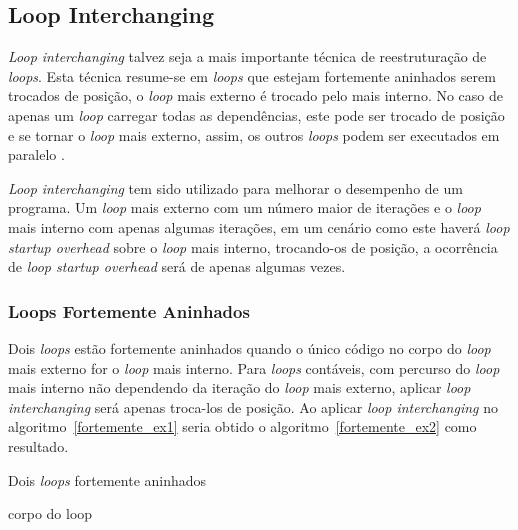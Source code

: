 \subsection{Loop Interchanging}

\textit{Loop interchanging} talvez seja a mais importante técnica de
reestruturação de \textit{loops}.
Esta técnica resume-se em \textit{loops} que estejam fortemente aninhados
serem trocados de posição, o \textit{loop} mais externo é trocado pelo mais
interno.
No caso de apenas um \textit{loop} carregar todas as dependências, este pode ser
trocado de posição e se tornar o \textit{loop} mais externo, assim, os outros
\textit{loops} podem ser executados em paralelo \cite{hpcfpc}.

\textit{Loop interchanging} tem sido utilizado para melhorar o desempenho 
de um programa.
Um \textit{loop} mais externo com um número maior de iterações e o 
\textit{loop} mais interno com apenas algumas iterações, em um cenário como este
haverá \textit{loop startup overhead} sobre o \textit{loop} mais interno,
trocando-os de posição, a ocorrência de \textit{loop startup overhead} será de
apenas algumas vezes.

\subsubsection{Loops Fortemente Aninhados}

Dois \textit{loops} estão fortemente aninhados quando o único código no corpo do
\textit{loop} mais externo for o \textit{loop} mais interno.
Para \textit{loops} contáveis, com percurso do \textit{loop} mais interno não
dependendo da iteração do \textit{loop} mais externo, aplicar \textit{loop
interchanging} será apenas troca-los de posição.
Ao aplicar \textit{loop interchanging} no algoritmo~\ref{fortemente_ex1}
seria obtido o algoritmo~\ref{fortemente_ex2} como resultado.

\begin{algorithm}
\caption{Dois \textit{loops} fortemente aninhados}
\label{fortemente_ex1}
\begin{algorithmic}[1]

\STATE corpo do loop
\ENDFOR
\ENDFOR

\end{algorithmic}
\end{algorithm}


